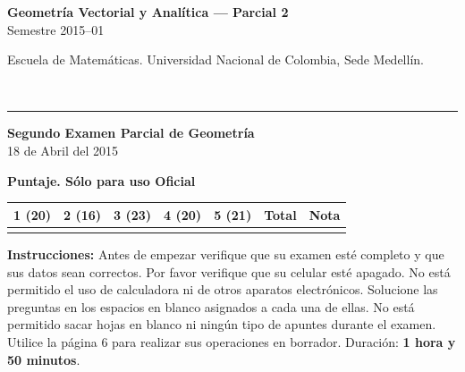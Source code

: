 \documentclass[11pt]{article}
\newcommand{\examheader}{%
  \noindent
  \begin{minipage}[t]{0.6\linewidth}
    {\small\bfseries Geometría Vectorial y Analítica --- Parcial 2}\\
    {\small Semestre 2015--01}
  \end{minipage}%
  \hfill
  \begin{minipage}[t]{0.35\linewidth}
    \raggedleft\small Escuela de Matemáticas. Universidad Nacional de Colombia, Sede Medellín.
  \end{minipage}\\[2pt]
  \rule{\linewidth}{0.6pt}
}
\begin{document}
\examheader

\begin{center}
{\bfseries Segundo Examen Parcial de Geometría}\\
18 de Abril del 2015

\vspace{4pt}
\textbf{Puntaje. Sólo para uso Oficial}

\vspace{2pt}
\begin{tabular}{|c|c|c|c|c|c|c|}
\hline
1 (20) & 2 (16) & 3 (23) & 4 (20) & 5 (21) & Total & Nota\\
\hline
 & & & & & & \\
\hline
\end{tabular}
\end{center}

\textbf{Instrucciones:} Antes de empezar verifique que su examen esté completo y que sus datos sean correctos. Por favor verifique que su celular esté apagado. No está permitido el uso de calculadora ni de otros aparatos electrónicos. Solucione las preguntas en los espacios en blanco asignados a cada una de ellas. No está permitido sacar hojas en blanco ni ningún tipo de apuntes durante el examen. Utilice la página 6 para realizar sus operaciones en borrador. Duración: \textbf{1 hora y 50 minutos}.

\vspace{10pt}
\end{document}
